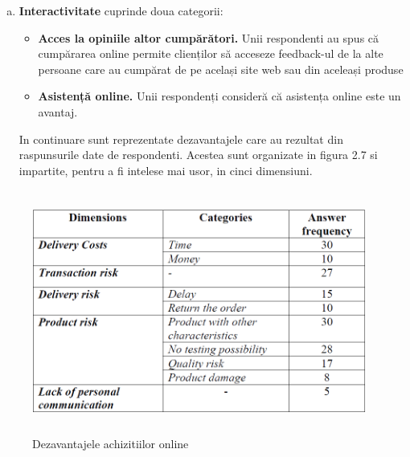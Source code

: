\documentclass[a4paper, 12pt]{article}
\begin{document}
\begin{enumerate}[a.]
\begin{itemize}
	\end{itemize}
	\item\textbf{Interactivitate} cuprinde doua categorii:
	\begin{itemize}
		\item\textbf {Acces la opiniile altor cumpărători.} Unii respondenti au spus că cumpărarea online permite clienților să acceseze feedback-ul de la alte persoane care au cumpărat de pe același site web sau din aceleași produse
		\item\textbf{Asistență online.} Unii respondenți consideră că asistența online este un avantaj.
	\end{itemize}
	\quad In continuare sunt reprezentate dezavantajele care au rezultat din raspunsurile date de respondenti. Acestea sunt organizate in figura 2.7 si impartite, pentru a fi intelese mai usor, in cinci dimensiuni.
	\end{enumerate}
		\begin{figure}[!htb]
		\centering
		\includegraphics[width=11cm, height=8cm]{"figures/noua.png"}
		\caption{Dezavantajele achizitiilor online}\label{fig:zece}
	\end{figure}
\end{document}
